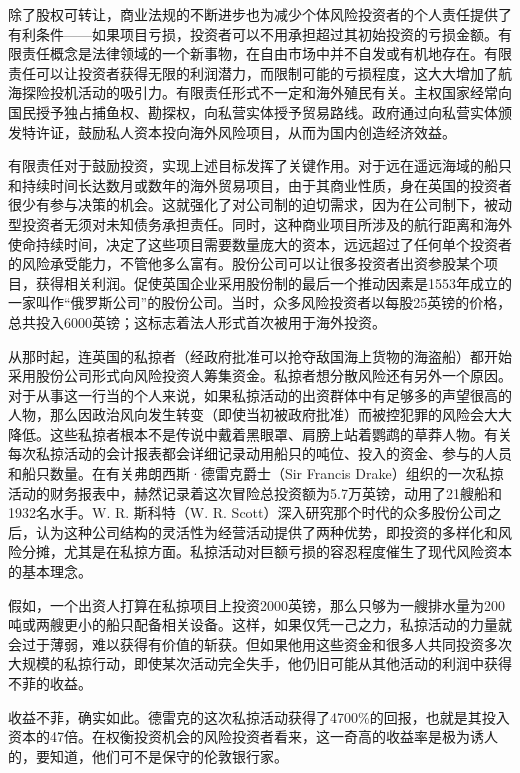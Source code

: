 \documentclass[12pt,oneside]{book}
\begin{document}
\begin{bookref}[frametitle={\cite{美国四百年}}]
除了股权可转让，商业法规的不断进步也为减少个体风险投资者的个人责任提供了有利条件——如果项目亏损，投资者可以不用承担超过其初始投资的亏损金额。有限责任概念是法律领域的一个新事物，在自由市场中并不自发或有机地存在。有限责任可以让投资者获得无限的利润潜力，而限制可能的亏损程度，这大大增加了航海探险投机活动的吸引力。有限责任形式不一定和海外殖民有关。主权国家经常向国民授予独占捕鱼权、勘探权，向私营实体授予贸易路线。政府通过向私营实体颁发特许证，鼓励私人资本投向海外风险项目，从而为国内创造经济效益。

有限责任对于鼓励投资，实现上述目标发挥了关键作用。对于远在遥远海域的船只和持续时间长达数月或数年的海外贸易项目，由于其商业性质，身在英国的投资者很少有参与决策的机会。这就强化了对公司制的迫切需求，因为在公司制下，被动型投资者无须对未知债务承担责任。同时，这种商业项目所涉及的航行距离和海外使命持续时间，决定了这些项目需要数量庞大的资本，远远超过了任何单个投资者的风险承受能力，不管他多么富有。股份公司可以让很多投资者出资参股某个项目，获得相关利润。促使英国企业采用股份制的最后一个推动因素是1553年成立的一家叫作“俄罗斯公司”的股份公司。当时，众多风险投资者以每股25英镑的价格，总共投入6000英镑；这标志着法人形式首次被用于海外投资。

从那时起，连英国的私掠者（经政府批准可以抢夺敌国海上货物的海盗船）都开始采用股份公司形式向风险投资人筹集资金。私掠者想分散风险还有另外一个原因。对于从事这一行当的个人来说，如果私掠活动的出资群体中有足够多的声望很高的人物，那么因政治风向发生转变（即使当初被政府批准）而被控犯罪的风险会大大降低。这些私掠者根本不是传说中戴着黑眼罩、肩膀上站着鹦鹉的草莽人物。有关每次私掠活动的会计报表都会详细记录动用船只的吨位、投入的资金、参与的人员和船只数量。在有关弗朗西斯·德雷克爵士（Sir Francis Drake）组织的一次私掠活动的财务报表中，赫然记录着这次冒险总投资额为5.7万英镑，动用了21艘船和1932名水手。W. R. 斯科特（W. R. Scott）深入研究那个时代的众多股份公司之后，认为这种公司结构的灵活性为经营活动提供了两种优势，即投资的多样化和风险分摊，尤其是在私掠方面。私掠活动对巨额亏损的容忍程度催生了现代风险资本的基本理念。

假如，一个出资人打算在私掠项目上投资2000英镑，那么只够为一艘排水量为200吨或两艘更小的船只配备相关设备。这样，如果仅凭一己之力，私掠活动的力量就会过于薄弱，难以获得有价值的斩获。但如果他用这些资金和很多人共同投资多次大规模的私掠行动，即使某次活动完全失手，他仍旧可能从其他活动的利润中获得不菲的收益。

收益不菲，确实如此。德雷克的这次私掠活动获得了4700\%的回报，也就是其投入资本的47倍。在权衡投资机会的风险投资者看来，这一奇高的收益率是极为诱人的，要知道，他们可不是保守的伦敦银行家。


\end{bookref}
\end{document}
